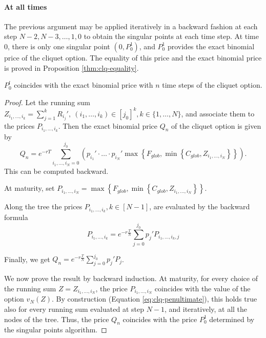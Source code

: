 \paragraph{At all times}
The previous argument may be applied iteratively in a backward fashion at each step $ N-2, N-3, \dots, 1, 0 $ to obtain the singular points at each time step. At time 0, there is only one singular point $ (0, P_0^1) $, and $ P_0^1 $ provides the exact binomial price of the cliquet option. The equality of this price and the exact binomial price is proved in Proposition \ref{thm:clq-equality}.


\begin{prp}
	\label{thm:clq-equality}
	$ P_0^l $ coincides with the exact binomial price with $ n $ time steps of the cliquet option.
\end{prp}

\begin{proof}
	Let the running sum $ Z_{i_1, \dots, i_k} = \sum_{j=1}^{k} R_{i_j}', \  (i_1, \dots, i_k) \in [j_0]^k, k \in \{ 1, \dots, N \} $, and associate them to the prices $ P_{i_1, \dots, i_k} $.
	Then the exact binomial price $ Q_n $ of the cliquet option is given by
	\begin{equation*}
		Q_n = e^{-rT} \sum_{i_1, \dots, i_N = 0}^{j_0} \left( p_{i_1}' \cdot \dots \cdot p_{i_N}' \max \left\{ F_{glob}, \min \left\{ C_{glob}, Z_{i_1, \dots, i_N} \right\} \right\} \right).
	\end{equation*}
	This can be computed backward.
	
	At maturity, set $ P_{i_1, \dots, i_N} = \max \left\{ F_{glob}, \min \left\{ C_{glob}, Z_{i_1, \dots, i_N} \right\} \right\} $.
	
	Along the tree the prices $ P_{i_1, \dots, i_k}, k \in [N-1] $, are evaluated by the
	backward formula
	\begin{equation*}
		P_{i_1, \dots, i_k}  =  e^{-r \frac{T}{N}}  \sum_{j=0}^{j_0} p_j' P_{i_1, \dots, i_k, j}
	\end{equation*}
	
	Finally, we get $ Q_n = e^{-r \frac{T}{N}}  \sum_{j=0}^{j_0} p_j' P_j $.
	
	We now prove the result by backward induction. At maturity, for every choice of the running sum $ Z = Z_{i_1, \dots, i_N} $, the price $ P_{i_1, \dots, i_N} $ coincides with the value of the option $ v_N(Z) $. By construction (Equation \ref{eq:clq-penultimate}), this holds true
	also for every running sum evaluated at step $ N - 1 $, and iteratively, at all the nodes
	of the tree. Thus, the price $ Q_n $ coincides with the price $ P_0^1 $ determined by the singular points algorithm.
\end{proof}



